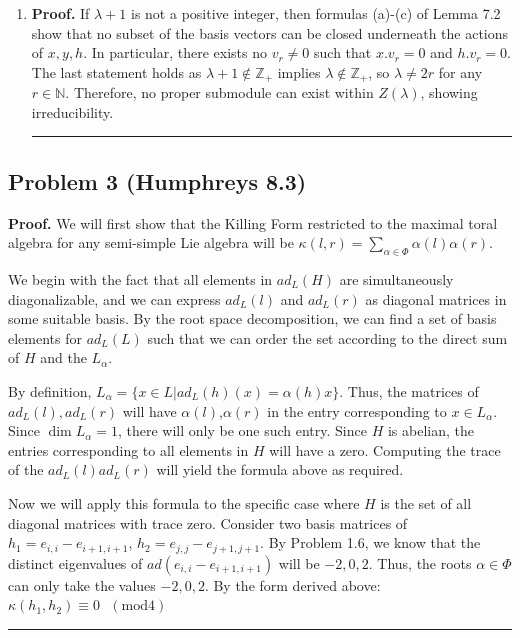 \documentclass[12pt]{article}%
\newenvironment{proof}[1][Proof]{\textbf{#1.} }{\ \rule{0.5em}{0.5em}}
\begin{document}
\begin{enumerate}
\begin{proof}
    Continue this until we reach a point where
    $ \mu_{k} + 1$ is no longer a positive integer. It must follow that $P_{k}$ is a proper $L$-submodule of $Z(\mu_{k})$ which contradicts its irreducibility (proven in (c)).
  \end{proof}
  \item
  \begin{proof}
    If $\lambda + 1$ is not a positive integer, then formulas (a)-(c) of Lemma 7.2 show that no subset of the basis vectors can be closed underneath the actions of $x,y,h$. In particular, there exists no $v_r \neq 0$ such that $x.v_r = 0$ and $h.v_r = 0$. The last statement holds as $\lambda + 1 \not\in \mathbb{Z}_+$ implies $\lambda \not\in \mathbb{Z}_+$, so $\lambda \neq 2r$ for any $r \in \mathbb{N}$.
    Therefore, no proper submodule can exist within $Z(\lambda)$, showing irreducibility.
  \end{proof}
\end{enumerate}

\subsection*{Problem 3 (Humphreys 8.3)}
\begin{proof}
We will first show that the Killing Form restricted to the maximal toral algebra for any semi-simple Lie algebra will be $\kappa(l,r) = \sum_{\alpha \in \Phi} \alpha(l)\alpha(r)$.

We begin with the fact that all elements in $ad_L(H)$ are simultaneously diagonalizable, and we can express $ad_L(l)$ and $ad_L(r)$ as diagonal matrices in some suitable basis. By the root space decomposition, we can find a set of basis elements for $ad_L(L)$ such that we can order the set according to the direct sum of $H$ and the $L_{\alpha}$.

By definition, $L_{\alpha} = \{ x\in L \vert ad_L(h)(x) = \alpha(h)x\}$. Thus, the matrices of $ad_L(l),ad_L(r)$ will have $\alpha(l)$,$\alpha(r)$ in the entry corresponding to $x \in L_{\alpha}$. Since $\dim{L_{\alpha}} = 1$, there will only be one such entry. Since $H$ is abelian, the entries corresponding to all elements in $H$ will have a zero. Computing the trace of the $ad_L(l)ad_L(r)$ will yield the formula above as required.

Now we will apply this formula to the specific case where $H$ is the set of all diagonal matrices with trace zero. Consider two basis matrices of $h_1 = e_{i,i} - e_{i+1,i+1}$, $h_2 = e_{j,j} - e_{j+1,j+1}$. By Problem 1.6, we know that the distinct eigenvalues of $ad(e_{i,i}- e_{i+1,i+1})$ will be $-2,0,2$. Thus, the roots $\alpha \in \Phi$ can only take the values $-2,0,2$. By the form derived above: $\kappa(h_1,h_2) \equiv 0 \text{ }  (\mathrm{mod} 4)$
\end{proof}
\end{document}
